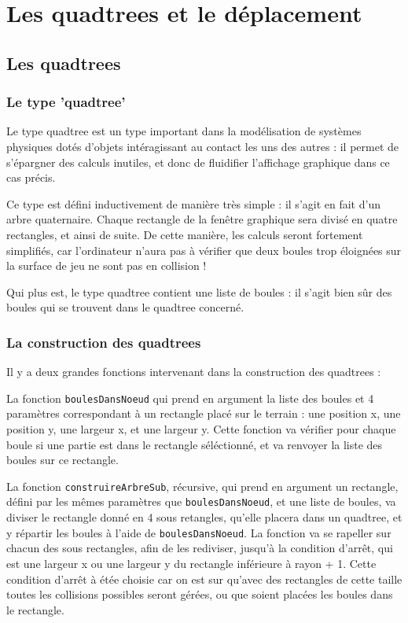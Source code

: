 \documentclass[10pt]{article}
\begin{document}
\section{Les quadtrees et le déplacement}


\subsection{Les quadtrees}
\subsubsection{Le type 'quadtree'}
Le type quadtree est un type important dans la modélisation de systèmes physiques dotés d'objets intéragissant au contact les uns des
autres : il permet de s'épargner des calculs inutiles, et donc de fluidifier l'affichage graphique dans ce cas précis.
\par Ce type est défini inductivement de manière très simple : il s'agit en fait d'un arbre quaternaire. Chaque rectangle de la fenêtre
graphique sera divisé en quatre rectangles, et ainsi de suite. De cette manière, les calculs seront fortement simplifiés, car l'ordinateur
n'aura pas à vérifier que deux boules trop éloignées sur la surface de jeu ne sont pas en collision !
\par Qui plus est, le type quadtree contient une liste de boules : il s'agit bien sûr des boules qui se trouvent dans le quadtree concerné.
\subsubsection{La construction des quadtrees}
Il y a deux grandes fonctions intervenant dans la construction des quadtrees : 
\par La fonction \texttt{boulesDansNoeud} qui prend en argument la liste des boules et 4 paramètres correspondant à un rectangle placé sur le terrain : une position x, une position y, une largeur x, et une largeur y. Cette fonction va vérifier pour chaque boule si une partie est dans le rectangle séléctionné, et va renvoyer la liste des boules sur ce rectangle.
\par La fonction \texttt{construireArbreSub}, récursive, qui prend en argument un rectangle, défini par les mêmes paramètres que \texttt{boulesDansNoeud}, et une liste de boules, va diviser le rectangle donné en 4 sous retangles, qu'elle placera dans un quadtree, et y répartir les boules à l'aide de \texttt{boulesDansNoeud}. La fonction va se rapeller sur chacun des sous rectangles, afin de les rediviser, jusqu'à la condition d'arrêt, qui est une largeur x ou une largeur y du rectangle inférieure à rayon + 1. Cette condition d'arrêt à étée choisie car on est sur qu'avec des rectangles de cette taille toutes les collisions possibles seront gérées, ou que soient placées les boules dans le rectangle.
\end{document}
